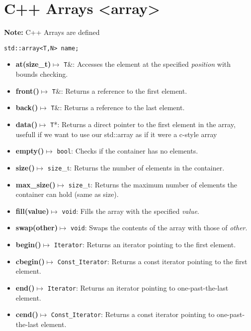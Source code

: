 \documentclass{report}
\begin{document}
    \pagebreak \bigbreak \noindent 
    \section{C++ Arrays <array>}
    \bigbreak \noindent 
    \textbf{Note:} C++ Arrays are defined
    \smallbreak \noindent
    \begin{verbatim}
std::array<T,N> name;
    \end{verbatim}
    \begin{itemize}
        \item \textbf{at(size\_t)}$\mapsto$ \texttt{T}\&: Accesses the element at the specified \textit{position} with bounds checking.
        \item \textbf{front()}$\mapsto$ \texttt{T}\&: Returns a reference to the first element.
        \item \textbf{back()}$\mapsto$ \texttt{T}\&: Returns a reference to the last element.
        \item \textbf{data()}$\mapsto$ \texttt{T}*: Returns a direct pointer to the first element in the array, usefull if we want to use our std::array as if it were a c-style array
        \item \textbf{empty()}$\mapsto$ \texttt{bool}: Checks if the container has no elements.
        \item \textbf{size()}$\mapsto$ \texttt{size}\_t: Returns the number of elements in the container.
        \item \textbf{max\_size()}$\mapsto$ \texttt{size}\_t: Returns the maximum number of elements the container can hold (same as size).
        \item \textbf{fill(value)}$\mapsto$ \texttt{void}: Fills the array with the specified \textit{value}.
        \item \textbf{swap(other)}$\mapsto$ \texttt{void}: Swaps the contents of the array with those of \textit{other}.
        \item \textbf{begin()}\(\mapsto\) \texttt{Iterator}: Returns an iterator pointing to the first element.
        \item \textbf{cbegin()}\(\mapsto\) \texttt{Const\_Iterator}: Returns a const iterator pointing to the first element.
        \item \textbf{end()}\(\mapsto\) \texttt{Iterator}: Returns an iterator pointing to one-past-the-last element.
        \item \textbf{cend()}\(\mapsto\) \texttt{Const\_Iterator}: Returns a const iterator pointing to one-past-the-last element.

\end{itemize}
\end{document}
